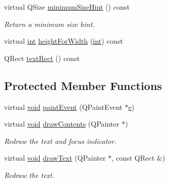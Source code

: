 \begin{DoxyCompactItemize}
virtual Q\-Size \hyperlink{class_qwt_text_label_a75ed6482ddb21e4f67ad9272f2ce66bb}{minimum\-Size\-Hint} () const 
\begin{DoxyCompactList}\small\item\em Return a minimum size hint. \end{DoxyCompactList}\item 
virtual \hyperlink{ioapi_8h_a787fa3cf048117ba7123753c1e74fcd6}{int} \hyperlink{class_qwt_text_label_ade1867a2c9308f2235cfacf675fa1d4c}{height\-For\-Width} (\hyperlink{ioapi_8h_a787fa3cf048117ba7123753c1e74fcd6}{int}) const 
\item 
Q\-Rect \hyperlink{class_qwt_text_label_ab4f9a18c47618903927fb2b40cbb06e2}{text\-Rect} () const 
\end{DoxyCompactItemize}
\subsection*{Protected Member Functions}
\begin{DoxyCompactItemize}
\item 
virtual \hyperlink{group___u_a_v_objects_plugin_ga444cf2ff3f0ecbe028adce838d373f5c}{void} \hyperlink{class_qwt_text_label_aff00274ee1c860530920b4feaca02393}{paint\-Event} (Q\-Paint\-Event $\ast$\hyperlink{_o_p_plots_8m_a9425be9aab51621e317ba7ade564b570}{e})
\item 
virtual \hyperlink{group___u_a_v_objects_plugin_ga444cf2ff3f0ecbe028adce838d373f5c}{void} \hyperlink{class_qwt_text_label_ab1d6c248f451517a32c626372670ab51}{draw\-Contents} (Q\-Painter $\ast$)
\begin{DoxyCompactList}\small\item\em Redraw the text and focus indicator. \end{DoxyCompactList}\item 
virtual \hyperlink{group___u_a_v_objects_plugin_ga444cf2ff3f0ecbe028adce838d373f5c}{void} \hyperlink{class_qwt_text_label_a88491c6677985ca048a3ebc095940df3}{draw\-Text} (Q\-Painter $\ast$, const Q\-Rect \&)
\begin{DoxyCompactList}\small\item\em Redraw the text. \end{DoxyCompactList}\end{DoxyCompactItemize}
